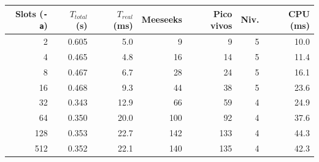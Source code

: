 \begin{tabular}{rrrrrrr}
\toprule
Slots (\texttt{-a}) & $T_{total}$ (s) & $T_{real}$ (ms) & Meeseeks & Pico vivos & Niv. & CPU (ms) \\
\midrule
2 & 0.605 & 5.0 & 9 & 9 & 5 & 10.0 \\
4 & 0.465 & 4.8 & 16 & 14 & 5 & 11.4 \\
8 & 0.467 & 6.7 & 28 & 24 & 5 & 16.1 \\
16 & 0.468 & 9.3 & 44 & 38 & 5 & 23.6 \\
32 & 0.343 & 12.9 & 66 & 59 & 4 & 24.9 \\
64 & 0.350 & 20.0 & 100 & 92 & 4 & 37.6 \\
128 & 0.353 & 22.7 & 142 & 133 & 4 & 44.3 \\
512 & 0.352 & 22.1 & 140 & 135 & 4 & 42.3 \\
\bottomrule
\end{tabular}
